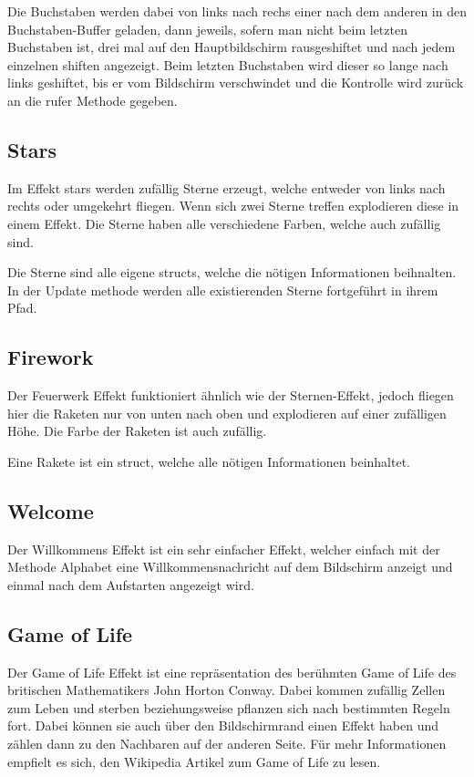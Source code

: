 \documentclass[12pt,a4paper]{article}
\begin{document}
Die Buchstaben werden dabei von links nach rechs einer nach dem anderen in den Buchstaben-Buffer geladen, dann jeweils, sofern man nicht beim letzten Buchstaben ist, drei mal auf den Hauptbildschirm rausgeshiftet und nach jedem einzelnen shiften angezeigt. Beim letzten Buchstaben wird dieser so lange nach links geshiftet, bis er vom Bildschirm verschwindet und die Kontrolle wird zurück an die rufer Methode gegeben.

\subsection{Stars}

Im Effekt stars werden zufällig Sterne erzeugt, welche entweder von links nach rechts oder umgekehrt fliegen. Wenn sich zwei Sterne treffen explodieren diese in einem Effekt. Die Sterne haben alle verschiedene Farben, welche auch zufällig sind. 

Die Sterne sind alle eigene structs, welche die nötigen Informationen beihnalten. In der Update methode werden alle existierenden Sterne fortgeführt in ihrem Pfad.

\subsection{Firework}

Der Feuerwerk Effekt funktioniert ähnlich wie der Sternen-Effekt, jedoch fliegen hier die Raketen nur von unten nach oben und explodieren auf einer zufälligen Höhe. Die Farbe der Raketen ist auch zufällig.

Eine Rakete ist ein struct, welche alle nötigen Informationen beinhaltet.

\subsection{Welcome}

Der Willkommens Effekt ist ein sehr einfacher Effekt, welcher einfach mit der Methode Alphabet eine Willkommensnachricht auf dem Bildschirm anzeigt und einmal nach dem Aufstarten angezeigt wird.

\subsection{Game of Life}

Der Game of Life Effekt ist eine repräsentation des berühmten Game of Life des britischen Mathematikers John Horton Conway. Dabei kommen  zufällig Zellen zum Leben und sterben beziehungsweise pflanzen sich nach bestimmten Regeln fort. Dabei können sie auch über den Bildschirmrand einen Effekt haben und zählen dann zu den Nachbaren auf der anderen Seite. Für mehr Informationen empfielt es sich, den Wikipedia Artikel zum Game of Life zu lesen.
\end{document}
